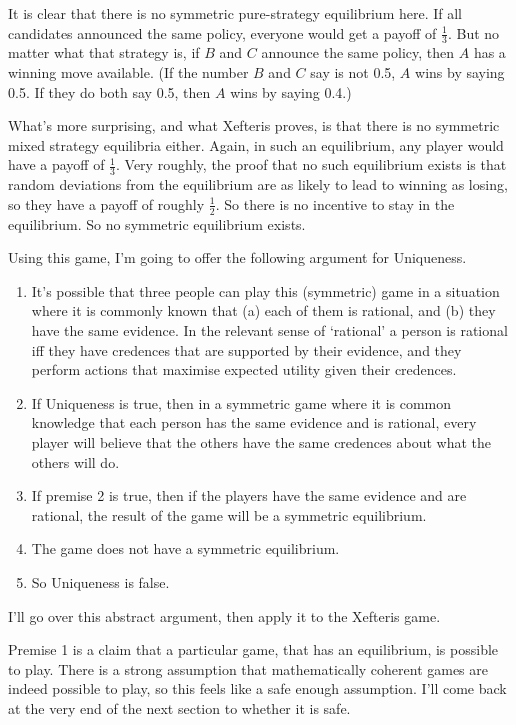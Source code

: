 \documentclass[
  11pt,
]{article}
\providecommand{\tightlist}{%
  \setlength{\itemsep}{0pt}\setlength{\parskip}{0pt}}
\begin{document}
It is clear that there is no symmetric pure-strategy equilibrium here. If all candidates announced the same policy, everyone would get a payoff of \(\frac{1}{3}\). But no matter what that strategy is, if \(B\) and \(C\) announce the same policy, then \(A\) has a winning move available. (If the number \(B\) and \(C\) say is not 0.5, \(A\) wins by saying 0.5. If they do both say 0.5, then \(A\) wins by saying 0.4.)

What's more surprising, and what Xefteris proves, is that there is no symmetric mixed strategy equilibria either. Again, in such an equilibrium, any player would have a payoff of \(\frac{1}{3}\). Very roughly, the proof that no such equilibrium exists is that random deviations from the equilibrium are as likely to lead to winning as losing, so they have a payoff of roughly \(\frac{1}{2}\). So there is no incentive to stay in the equilibrium. So no symmetric equilibrium exists.

Using this game, I'm going to offer the following argument for Uniqueness.

\begin{enumerate}
\def\labelenumi{\arabic{enumi}.}
\tightlist
\item
  It's possible that three people can play this (symmetric) game in a situation where it is commonly known that (a) each of them is rational, and (b) they have the same evidence. In the relevant sense of `rational' a person is rational iff they have credences that are supported by their evidence, and they perform actions that maximise expected utility given their credences.
\item
  If Uniqueness is true, then in a symmetric game where it is common knowledge that each person has the same evidence and is rational, every player will believe that the others have the same credences about what the others will do.
\item
  If premise 2 is true, then if the players have the same evidence and are rational, the result of the game will be a symmetric equilibrium.
\item
  The game does not have a symmetric equilibrium.
\item
  So Uniqueness is false.
\end{enumerate}

I'll go over this abstract argument, then apply it to the Xefteris game.

Premise 1 is a claim that a particular game, that has an equilibrium, is possible to play. There is a strong assumption that mathematically coherent games are indeed possible to play, so this feels like a safe enough assumption. I'll come back at the very end of the next section to whether it is safe.
\end{document}
